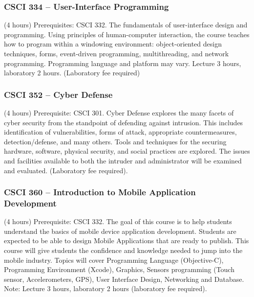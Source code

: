 \subsubsection{CSCI 334 -- User-Interface Programming}%
\label{course:CSCI:334}
(4 hours) Prerequisites: CSCI 332. The fundamentals of user-interface design and programming. Using principles of human-computer interaction, the course teaches how to program within a windowing environment: object-oriented design techniques, forms, event-driven programming, multithreading, and network programming. Programming language and platform may vary. Lecture 3 hours, laboratory 2 hours. (Laboratory fee required)

\subsubsection{CSCI 352 -- Cyber Defense}%
\label{course:CSCI:352}
(4 hours) Prerequisite: CSCI 301. Cyber Defense explores the many facets of cyber security from the standpoint of defending against intrusion.  This includes identification of vulnerabilities, forms of attack, appropriate countermeasures, detection/defense, and many others.  Tools and techniques for the securing hardware, software, physical security, and social practices are explored.   The issues and facilities available to both the intruder and administrator will be examined and evaluated. (Laboratory fee required).

\subsubsection{CSCI 360 -- Introduction to Mobile Application Development}%
\label{course:CSCI:360}
(4 hours) Prerequisite: CSCI 332. The goal of this course is to help students understand the basics of mobile device application development. Students are expected to be able to design Mobile Applications that are ready to publish. This course will give students the confidence and knowledge needed to jump into the mobile industry. Topics will cover Programming Language (Objective-C), Programming Environment (Xcode), Graphics, Sensors programming (Touch sensor, Accelerometers, GPS), User Interface Design, Networking and Database. Note: Lecture 3 hours, laboratory 2 hours (laboratory fee required).



